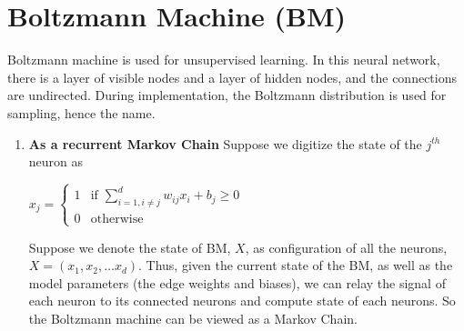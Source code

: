 \documentclass[letterpaper,10pt,english]{article}
\begin{document}
\section{Boltzmann Machine (BM)}
Boltzmann machine is used for unsupervised learning. In this neural network, there is a layer of visible nodes and a layer of hidden nodes, and the connections are undirected. During implementation, the Boltzmann distribution is used for sampling, hence the name.
\begin{enumerate}
	\item \textbf{As a recurrent Markov Chain} Suppose we digitize the state of the $j^{th}$ neuron as\\
	\begin{center}
		$ x_{j}=
		\begin{cases}
		1 & \text{if }\sum_{i=1, i\neq j}^d w_{ij} x_i +b_j \geq 0\\
		0 & \text{otherwise}
		\end{cases}
		$
	\end{center}
	Suppose we denote the state of BM, $X$, as configuration of all the neurons, $X = (x_{1}, x_{2}, \ldots x_{d})$. Thus, given the current state of the BM, as well as the  model parameters (the edge weights and biases), we can relay the signal of each neuron to its connected neurons and compute state of each neurons. So the Boltzmann machine can be viewed as a Markov Chain.
	

\end{enumerate}
\end{document}
